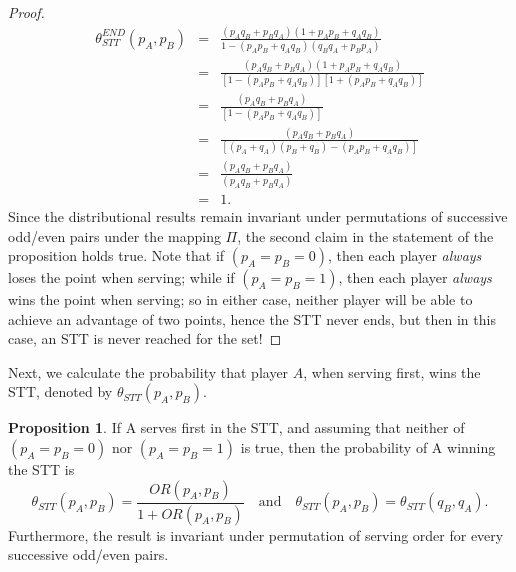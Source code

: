 \documentclass[11pt]{article}
\theoremstyle{plain}
\theoremstyle{definition}
\newtheorem{proposition}[theorem]{Proposition}
\begin{document}
\begin{proof}
{%
\begin{eqnarray*}
\theta_{STT}^{END}(p_A,p_B) & = & \frac{(p_Aq_B + p_Bq_A)(1 + p_Ap_B + q_Aq_B)}{1 - (p_Ap_B +q_Aq_B)(q_Bq_A + p_Bp_A)} \\
& = & \frac{(p_Aq_B + p_Bq_A)(1 + p_Ap_B + q_Aq_B)}{[1 - (p_Ap_B +q_Aq_B)][1 + (p_Ap_B +q_Aq_B)]} \\
& = & \frac{(p_Aq_B + p_Bq_A)}{[1 - (p_Ap_B +q_Aq_B)]} \\
& = & \frac{(p_Aq_B + p_Bq_A)}{[(p_A+q_A)(p_B+q_B) - (p_Ap_B +q_Aq_B)]} \\
& = & \frac{(p_Aq_B + p_Bq_A)}{(p_Aq_B + p_Bq_A)} \\
& = & 1.
\end{eqnarray*}
%
}
%
Since the distributional results remain invariant under permutations of successive odd/even pairs under the mapping $\Pi$, the second claim in the statement of the proposition holds true.
%
Note that if $(p_A=p_B=0)$, then each player {\em always} loses the point when serving; while if $(p_A=p_B=1)$, then each player {\em always} wins the point when serving; so in either case, neither player will be able to achieve an advantage of two points, hence the STT never ends, but then in this case, an STT is never reached for the set!
\end{proof}

Next, we calculate the probability that player $A$, when serving first, wins the STT, denoted by $\theta_{STT}(p_A,p_B)$.  

\begin{proposition} \label{A wins STT}
If A serves first in the STT, and assuming that neither of $(p_A=p_B=0)$ nor $(p_A=p_B=1)$ is true, then the probability of A winning the STT is
%
$$\theta_{STT}(p_A,p_B) = \frac{OR(p_A,p_B)}{1 + OR(p_A,p_B)}
%
\quad \mbox{and} \quad
%
\theta_{STT}(p_A,p_B) =  \theta_{STT}(q_B,q_A).$$
%
Furthermore, the result is invariant under permutation of serving order for every successive odd/even pairs.
\end{proposition}
\end{document}

